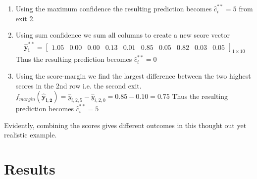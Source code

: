 {\begin{enumerate}
		\item 	Using the maximum confidence the resulting prediction becomes $ \hat{c}^{**}_{i} =  5$ from exit 2.
		\item 	Using sum confidence we sum all columns to create a new score vector
		\begin{align*}
		\bm{\hat{y}^{**}_{i}} = 
		\begin{bmatrix}
		1.05 & 0.00 & 0.00 & 0.13 & 0.01 & 0.85 & 0.05 & 0.82 & 0.03 & 0.05
		\end{bmatrix}_{1 \times 10}
		\end{align*}
		Thus the resulting prediction becomes $ \hat{c}^{**}_{i} = 0$
		\item Using the score-margin we find the largest difference between the two highest scores in the 2nd row i.e. the second exit. $ f_{margin}\left(\bm{\hat{y}_{i,2}}\right) = \hat{y}_{i,2,5} - \hat{y}_{i,2,0} = 0.85 - 0.10 =0.75 $ Thus the resulting prediction becomes $ \hat{c}^{**}_i = 5$
	\end{enumerate}
	Evidently, combining the scores gives different outcomes in this thought out yet realistic example.
	
}

\section{Results} \label{sec:edge-results}

